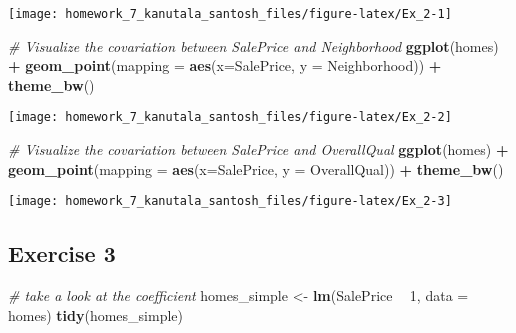 \documentclass[]{article}
\newenvironment{Shaded}{\begin{snugshade}}{\end{snugshade}}
\newcommand{\KeywordTok}[1]{\textcolor[rgb]{0.13,0.29,0.53}{\textbf{#1}}}
\newcommand{\DataTypeTok}[1]{\textcolor[rgb]{0.13,0.29,0.53}{#1}}
\newcommand{\DecValTok}[1]{\textcolor[rgb]{0.00,0.00,0.81}{#1}}
\newcommand{\StringTok}[1]{\textcolor[rgb]{0.31,0.60,0.02}{#1}}
\newcommand{\CommentTok}[1]{\textcolor[rgb]{0.56,0.35,0.01}{\textit{#1}}}
\newcommand{\OperatorTok}[1]{\textcolor[rgb]{0.81,0.36,0.00}{\textbf{#1}}}
\newcommand{\NormalTok}[1]{#1}
\begin{document}
\begin{center}\texttt{[image: homework\_7\_kanutala\_santosh\_files/figure-latex/Ex\_2-1]} \end{center}

\begin{Shaded}
\begin{Highlighting}[]
\CommentTok{# Visualize the covariation between SalePrice and Neighborhood}
\KeywordTok{ggplot}\NormalTok{(homes) }\OperatorTok{+}
\StringTok{  }\KeywordTok{geom_point}\NormalTok{(}\DataTypeTok{mapping =} \KeywordTok{aes}\NormalTok{(}\DataTypeTok{x=}\NormalTok{SalePrice, }\DataTypeTok{y =}\NormalTok{ Neighborhood)) }\OperatorTok{+}\StringTok{ }
\StringTok{  }\KeywordTok{theme_bw}\NormalTok{()}
\end{Highlighting}
\end{Shaded}

\begin{center}\texttt{[image: homework\_7\_kanutala\_santosh\_files/figure-latex/Ex\_2-2]} \end{center}

\begin{Shaded}
\begin{Highlighting}[]
\CommentTok{# Visualize the covariation between SalePrice and OverallQual}
\KeywordTok{ggplot}\NormalTok{(homes) }\OperatorTok{+}
\StringTok{  }\KeywordTok{geom_point}\NormalTok{(}\DataTypeTok{mapping =} \KeywordTok{aes}\NormalTok{(}\DataTypeTok{x=}\NormalTok{SalePrice, }\DataTypeTok{y =}\NormalTok{ OverallQual)) }\OperatorTok{+}
\StringTok{  }\KeywordTok{theme_bw}\NormalTok{()}
\end{Highlighting}
\end{Shaded}

\begin{center}\texttt{[image: homework\_7\_kanutala\_santosh\_files/figure-latex/Ex\_2-3]} \end{center}

\subsection{Exercise 3}\label{exercise-3}

\begin{Shaded}
\begin{Highlighting}[]
\CommentTok{# take a look at the coefficient}
\NormalTok{homes_simple <-}\StringTok{ }\KeywordTok{lm}\NormalTok{(SalePrice }\OperatorTok{~}\StringTok{ }\DecValTok{1}\NormalTok{, }\DataTypeTok{data =}\NormalTok{ homes)}
\KeywordTok{tidy}\NormalTok{(homes_simple)}
\end{Highlighting}
\end{Shaded}
\end{document}
